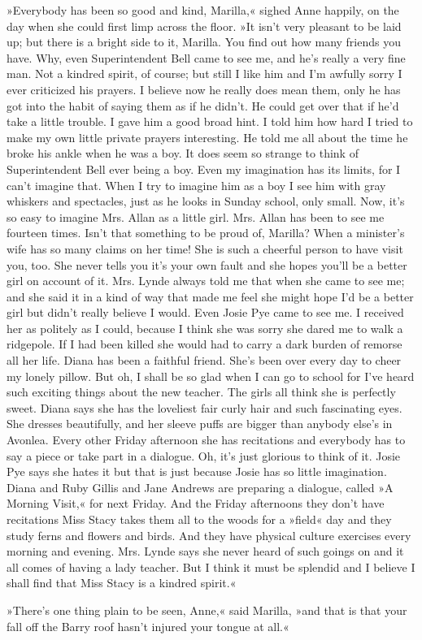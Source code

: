 »Everybody has been so good and kind, Marilla,« sighed Anne happily, on the day when she could first limp across the floor. »It isn’t very pleasant to be laid up; but there is a bright side to it, Marilla. You find out how many friends you have. Why, even Superintendent Bell came to see me, and he’s really a very fine man. Not a kindred spirit, of course; but still I like him and I’m awfully sorry I ever criticized his prayers. I believe now he really does mean them, only he has got into the habit of saying them as if he didn’t. He could get over that if he’d take a little trouble. I gave him a good broad hint. I told him how hard I tried to make my own little private prayers interesting. He told me all about the time he broke his ankle when he was a boy. It does seem so strange to think of Superintendent Bell ever being a boy. Even my imagination has its limits, for I can’t imagine that. When I try to imagine him as a boy I see him with gray whiskers and spectacles, just as he looks in Sunday school, only small. Now, it’s so easy to imagine Mrs. Allan as a little girl. Mrs. Allan has been to see me fourteen times. Isn’t that something to be proud of, Marilla? When a minister’s wife has so many claims on her time! She is such a cheerful person to have visit you, too. She never tells you it’s your own fault and she hopes you’ll be a better girl on account of it. Mrs. Lynde always told me that when she came to see me; and she said it in a kind of way that made me feel she might hope I’d be a better girl but didn’t really believe I would. Even Josie Pye came to see me. I received her as politely as I could, because I think she was sorry she dared me to walk a ridgepole. If I had been killed she would had to carry a dark burden of remorse all her life. Diana has been a faithful friend. She’s been over every day to cheer my lonely pillow. But oh, I shall be so glad when I can go to school for I’ve heard such exciting things about the new teacher. The girls all think she is perfectly sweet. Diana says she has the loveliest fair curly hair and such fascinating eyes. She dresses beautifully, and her sleeve puffs are bigger than anybody else’s in Avonlea. Every other Friday afternoon she has recitations and everybody has to say a piece or take part in a dialogue. Oh, it’s just glorious to think of it. Josie Pye says she hates it but that is just because Josie has so little imagination. Diana and Ruby Gillis and Jane Andrews are preparing a dialogue, called »A Morning Visit,« for next Friday. And the Friday afternoons they don’t have recitations Miss Stacy takes them all to the woods for a »field« day and they study ferns and flowers and birds. And they have physical culture exercises every morning and evening. Mrs. Lynde says she never heard of such goings on and it all comes of having a lady teacher. But I think it must be splendid and I believe I shall find that Miss Stacy is a kindred spirit.«

»There’s one thing plain to be seen, Anne,« said Marilla, »and that is that your fall off the Barry roof hasn’t injured your tongue at all.«